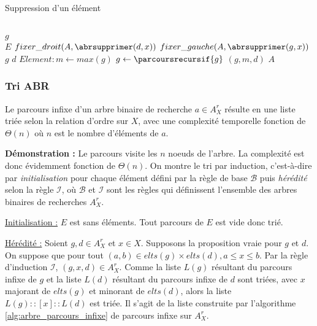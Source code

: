 \documentclass[../../../main.tex]{subfiles}
\begin{document}
\begin{algorithm}
\caption{Suppression d'un élément \label{alg:suppression_abr}}
\Indm\nonl{} \\
\Indp
{} {
	\Return $g$
}
 {
	\Return {}
}
\Indm\nonl{} \\
\Indp
{} {
	 {
		\Return $E$ 
	}
	 {
		 {
			$fixer\_droit(A, \abrsupprimer(d, x))$\;
		}
		 {
			$fixer\_gauche(A, \abrsupprimer(g, x))$\;
		}
		 {
			 {
				\Return $g$
			}
			 {
				\Return $d$
			}
			$Element:m\leftarrow max(g)$\;
			$g\leftarrow \parcoursrecursif{g}$\;
			\Return $(g, m, d)$
		}
		\Return $A$
	}
}
\end{algorithm}
\subsubsection{Tri ABR}
 Le parcours infixe d'un arbre binaire de recherche $a\in A^r_X$ résulte en une liste triée selon la relation d'ordre sur $X$, avec une complexité temporelle fonction de $\Theta(n)$ où $n$ est le nombre d'éléments de $a$.

\textbf{Démonstration :} Le parcours visite les $n$ noeuds de l'arbre. La complexité est donc évidemment fonction de $\Theta(n)$. On montre le tri par induction, c'est-à-dire par \textit{initialisation} pour chaque élément défini par la règle de base $\mathcal{B}$ puis \textit{hérédité} selon la règle $\mathcal{I}$, où $\mathcal{B}$ et $\mathcal{I}$ sont les règles qui définissent l'ensemble des arbres binaires de recherches $A^r_X$.

\underline{Initialisation :} $E$ est sans éléments. Tout parcours de $E$ est vide donc trié.

\underline{Hérédité :} Soient $g, d\in A^r_X$ et $x\in X$. Supposons la proposition vraie pour $g$ et $d$. On suppose que pour tout $(a, b)\in elts(g)\times elts(d), a \leq x\leq b$. Par la règle d'induction $\mathcal{I}$, $(g, x, d)\in A^r_X$. Comme la liste $L(g)$ résultant du parcours infixe de $g$ et la liste $L(d)$ résultant du parcours infixe de $d$ sont triées, avec $x$ majorant de $elts(g)$ et minorant de $elts(d)$, alors la liste $L(g)::[x]::L(d)$ est triée. Il s'agit de la liste construite par l'algorithme \ref{alg:arbre_parcours_infixe} de parcours infixe sur $A^r_X$.
\end{document}
